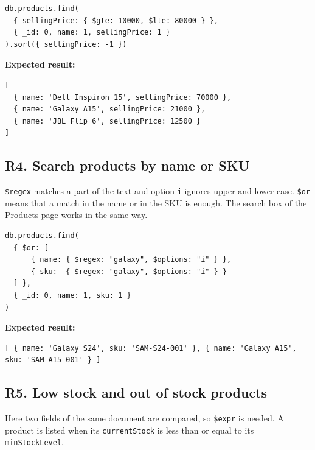 \documentclass[11pt,a4paper]{article}
\newcommand{\code}[1]{\texttt{#1}}
\begin{document}
\begin{minipage}{\linewidth}
\begin{lstlisting}[style=query]
db.products.find(
  { sellingPrice: { $gte: 10000, $lte: 80000 } },
  { _id: 0, name: 1, sellingPrice: 1 }
).sort({ sellingPrice: -1 })
\end{lstlisting}
\end{minipage}

\noindent\textbf{Expected result:}
\begin{lstlisting}[style=result]
[
  { name: 'Dell Inspiron 15', sellingPrice: 70000 },
  { name: 'Galaxy A15', sellingPrice: 21000 },
  { name: 'JBL Flip 6', sellingPrice: 12500 }
]
\end{lstlisting}

\subsection*{R4. Search products by name or SKU}
\code{\$regex} matches a part of the text and option \code{i} ignores upper and lower case. \code{\$or} means that a match in the name or in the SKU is enough. The search box of the Products page works in the same way.

\begin{minipage}{\linewidth}
\begin{lstlisting}[style=query]
db.products.find(
  { $or: [
      { name: { $regex: "galaxy", $options: "i" } },
      { sku:  { $regex: "galaxy", $options: "i" } }
  ] },
  { _id: 0, name: 1, sku: 1 }
)
\end{lstlisting}
\end{minipage}

\noindent\textbf{Expected result:}
\begin{lstlisting}[style=result]
[ { name: 'Galaxy S24', sku: 'SAM-S24-001' }, { name: 'Galaxy A15', sku: 'SAM-A15-001' } ]
\end{lstlisting}

\subsection*{R5. Low stock and out of stock products}
Here two fields of the same document are compared, so \code{\$expr} is needed. A product is listed when its \code{currentStock} is less than or equal to its \code{minStockLevel}.
\end{document}
